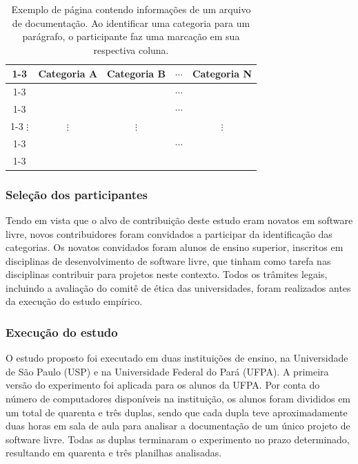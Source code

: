 \begin{table}[]
\small
\caption[Exemplo de página contendo informações de um arquivo de documentação]{Exemplo de página contendo informações de um arquivo de documentação. Ao identificar uma categoria para um parágrafo, o participante  faz uma marcação em sua respectiva coluna.}
\begin{tabular}{ccccc}
\cline{1-3} \cline{5-5}
\multicolumn{1}{|c|}{\cellcolor{gray} Parágrafos} & \multicolumn{1}{c|}{\cellcolor{gray} Categoria A} & \multicolumn{1}{c|}{\cellcolor{gray} Categoria B} & \multicolumn{1}{c|}{$\cdots$} & \multicolumn{1}{c|}{\cellcolor{gray} Categoria N} \\ \cline{1-3} \cline{5-5} 
\multicolumn{1}{|c|}{} & \multicolumn{1}{c|}{} & \multicolumn{1}{c|}{} & \multicolumn{1}{c|}{$\cdots$} & \multicolumn{1}{c|}{\textbf{}} \\ \cline{1-3} \cline{5-5} 
\multicolumn{1}{|c|}{} & \multicolumn{1}{c|}{\textbf{}} & \multicolumn{1}{c|}{} & \multicolumn{1}{c|}{$\cdots$} & \multicolumn{1}{c|}{\textbf{}} \\ \cline{1-3} \cline{5-5} 
$\vdots$ & $\vdots$ & $\vdots$ & & $\vdots$ \\ \cline{1-3} \cline{5-5} 
\multicolumn{1}{|c|}{} & \multicolumn{1}{c|}{} & \multicolumn{1}{c|}{\textbf{}} & \multicolumn{1}{c|}{$\cdots$} & \multicolumn{1}{c|}{\textbf{}} \\ \cline{1-3} \cline{5-5} 
\end{tabular}
\label{tab:planilha}
\end{table}
    
\subsubsection{Seleção dos participantes}
Tendo em vista que o alvo de contribuição deste estudo eram novatos em software livre, novos contribuidores foram convidados a participar da identificação das categorias. Os novatos convidados foram alunos de ensino superior, inscritos em disciplinas de desenvolvimento de software livre, que tinham como tarefa nas disciplinas contribuir para projetos neste contexto. Todos os trâmites legais, incluindo a avaliação do comitê de ética das universidades, foram realizados antes da execução do estudo empírico.

\subsubsection{Execução do estudo}
O estudo proposto foi executado em duas instituições de ensino, na Universidade de São Paulo (USP) e na Universidade Federal do Pará (UFPA). A primeira versão do experimento foi aplicada para os alunos da UFPA. Por conta do número de computadores disponíveis na instituição, os alunos foram divididos em um total de quarenta e três duplas, sendo que cada dupla teve aproximadamente duas horas em sala de aula para analisar a documentação de um único projeto de software livre. Todas as duplas terminaram o experimento no prazo determinado, resultando em quarenta e três planilhas analisadas. 

